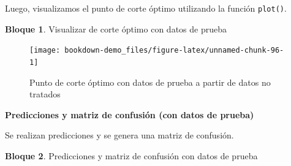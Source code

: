 \documentclass[]{book}
\newenvironment{Shaded}{\begin{snugshade}}{\end{snugshade}}
\newcommand{\DataTypeTok}[1]{\textcolor[rgb]{0.13,0.29,0.53}{#1}}
\newcommand{\DecValTok}[1]{\textcolor[rgb]{0.00,0.00,0.81}{#1}}
\newcommand{\FloatTok}[1]{\textcolor[rgb]{0.00,0.00,0.81}{#1}}
\newcommand{\KeywordTok}[1]{\textcolor[rgb]{0.13,0.29,0.53}{\textbf{#1}}}
\newcommand{\NormalTok}[1]{#1}
\newcommand{\OperatorTok}[1]{\textcolor[rgb]{0.81,0.36,0.00}{\textbf{#1}}}
\newcommand{\OtherTok}[1]{\textcolor[rgb]{0.56,0.35,0.01}{#1}}
\newcommand{\StringTok}[1]{\textcolor[rgb]{0.31,0.60,0.02}{#1}}
\theoremstyle{definition}
\theoremstyle{definition}
\newtheorem{example}{Bloque}[chapter]
\theoremstyle{definition}
\theoremstyle{definition}
\theoremstyle{remark}
\begin{document}
Luego, visualizamos el punto de corte óptimo utilizando la función \texttt{plot()}.

\begin{example}
\protect\hypertarget{exm:bloque23nbm}{}{\label{exm:bloque23nbm} }Visualizar de corte óptimo con datos de prueba
\end{example}

\begin{Shaded}
\end{Shaded}

\begin{figure}
\texttt{[image: bookdown-demo\_files/figure-latex/unnamed-chunk-96-1]} \caption{Punto de corte óptimo con datos de prueba a partir de datos no tratados}\label{fig:unnamed-chunk-96}
\end{figure}

\textbf{Predicciones y matriz de confusión (con datos de prueba)}

Se realizan predicciones y se genera una matriz de confusión.

\begin{example}
\protect\hypertarget{exm:bloque24nbm}{}{\label{exm:bloque24nbm} }Predicciones y matriz de confusión con datos de prueba
\end{example}

\begin{Shaded}
\end{Shaded}
\end{document}

